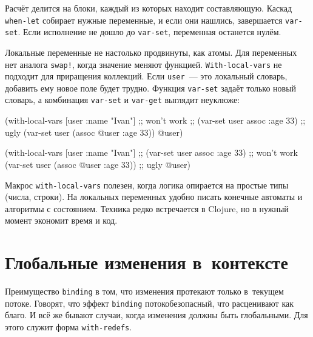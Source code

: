 Расчёт делится на блоки, каждый из которых находит составляющую. Каскад
\verb|when-let| собирает нужные переменные, и если они нашлись, завершается
\verb|var-set|. Если исполнение не дошло до \verb|var-set|, переменная останется
нулём.

Локальные переменные не настолько продвинуты, как атомы. Для переменных нет
аналога \verb|swap!|, когда значение меняют функцией. \verb|With-local-vars| не
подходит для приращения коллекций. Если \verb|user|~--- это локальный словарь,
добавить ему новое поле будет трудно. Функция \verb|var-set| задаёт только новый
словарь, а комбинация \verb|var-set| и \verb|var-get| выглядит неуклюже:

\ifnarrow

\begin{english}
  \begin{clojure}
(with-local-vars [user {:name "Ivan"}]
  ;; won't work
  ;; (var-set user assoc :age 33)
  ;; ugly
  (var-set user (assoc @user :age 33))
  @user)
  \end{clojure}
\end{english}

\else

\begin{english}
  \begin{clojure}
(with-local-vars [user {:name "Ivan"}]
  ;; (var-set user assoc :age 33) ;; won't work
  (var-set user (assoc @user :age 33)) ;; ugly
  @user)
  \end{clojure}
\end{english}

\fi

Макрос \verb|with-local-vars| полезен, когда логика опирается на простые типы
(числа, строки). На локальных переменных удобно писать конечные автоматы и
алгоритмы с состоянием. Техника редко встречается в Clojure, но в нужный момент
экономит время и код.

\section{Глобальные изменения в~контексте}


\label{with-redefs}

Преимущество \verb|binding| в том, что изменения протекают только в~текущем
потоке. Говорят, что эффект \verb|binding| потокобезопасный, что расценивают
как благо. И всё же бывают случаи, когда изменения должны быть глобальными. Для
этого служит форма \verb|with-redefs|.

